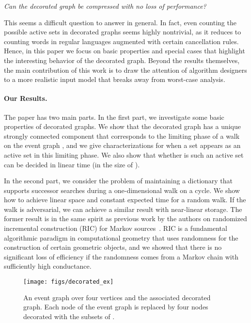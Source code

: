\documentclass[oribibl,envcountsect,envcountsame]{llncs}
\begin{document}
\begin{center}
\emph{Can the decorated graph
be compressed with no loss of performance?}
\end{center}


This seems a difficult question to answer in general. 
In fact, even counting the possible active sets in decorated graphs seems
highly nontrivial, as it reduces to counting words 
in regular languages augmented 
with certain cancellation rules. Hence, in this paper we 
focus on basic properties and special cases that highlight
the interesting behavior of the decorated graph.
Beyond the results themselves, the main contribution
of this work is to draw the attention of algorithm designers 
to a more realistic
input model that breaks away from worst-case analysis.

\paragraph{Our Results.}
The paper has two main parts. In the first part, 
we investigate some basic properties of decorated graphs.
We show that the decorated graph  has a unique strongly connected
component that corresponds to the limiting phase of a walk
on the event graph , and we give characterizations
for when a set  appears as an active set 
in this limiting phase. We also show that whether  is such an
active set can be decided in linear time (in the size of ).

In the second part, we consider the problem of maintaining a dictionary
that supports successor searches during a one-dimensional
walk on a cycle. We show how to achieve linear space and constant 
expected time for a random walk. If the walk is adversarial,
we can achieve a similar result with near-linear storage.
The former result  is in
the same spirit as previous work by the authors on randomized incremental 
construction (RIC) for Markov sources~\cite{ChazelleMu09}. 
RIC is a fundamental algorithmic paradigm
in computational geometry that uses randomness for the construction
of certain geometric objects, and we showed that there is no 
significant loss of efficiency if the  randomness comes 
from a Markov chain with sufficiently high 
conductance.

\begin{figure}
\begin{center}
\texttt{[image: figs/decorated\_ex]}
\end{center}
\caption{An event graph over four vertices and the associated
  decorated graph. Each node of the event graph is replaced by
  four nodes decorated with the subsets of .
}
\label{fig:decorated_ex}
\end{figure}
\end{document}
